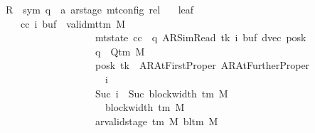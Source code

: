 \begin{isabellebody}
\ \ \ \ \ R{\isacharprime}{\kern0pt}\ {\isacharcolon}{\kern0pt}{\isacharcolon}{\kern0pt}\ {\isachardoublequoteopen}{\isacharparenleft}{\kern0pt}sym{}{\isacharcomma}{\kern0pt}\ {\isacharprime}{\kern0pt}q\ {\isasymtimes}\ {\isacharprime}{\kern0pt}a\ ar{\isacharunderscore}{\kern0pt}stage{\isacharparenright}{\kern0pt}\ mt{\isacharunderscore}{\kern0pt}config\ rel{\isachardoublequoteclose}\isanewline
\ \ \ leaf{\isacharcolon}{\kern0pt}\isanewline
\ \ \ \ \ \ \ \ {\isachardoublequoteopen}{\isasymAnd}cc\ i\ buf{\isacharprime}{\kern0pt}{\isachardot}{\kern0pt}\ {\isasymlbrakk}\ valid{\isacharunderscore}{\kern0pt}mttm\ M{\isacharsemicolon}{\kern0pt}\isanewline
\ \ \ \ \ \ \ \ \ \ \ \ \ \ \ \ \ \ \ \ \ \ \ mt{\isacharunderscore}{\kern0pt}state\ cc\ {\isacharequal}{\kern0pt}\ {\isacharparenleft}{\kern0pt}q{\isacharcomma}{\kern0pt}\ AR{\isacharunderscore}{\kern0pt}SimRead{\isacharcomma}{\kern0pt}\ tk{\isacharcomma}{\kern0pt}\ i{\isacharcomma}{\kern0pt}\ buf{\isacharprime}{\kern0pt}{\isacharcomma}{\kern0pt}\ dvec{\isacharcomma}{\kern0pt}\ posk{\isacharparenright}{\kern0pt}{\isacharsemicolon}{\kern0pt}\isanewline
\ \ \ \ \ \ \ \ \ \ \ \ \ \ \ \ \ \ \ \ \ \ \ q\ {\isasymin}\ Q{\isacharunderscore}{\kern0pt}tm\ M{\isacharsemicolon}{\kern0pt}\isanewline
\ \ \ \ \ \ \ \ \ \ \ \ \ \ \ \ \ \ \ \ \ \ \ posk\ tk\ {\isasymin}\ {\isacharbraceleft}{\kern0pt}AR{\isacharunderscore}{\kern0pt}AtFirstProper{\isacharcomma}{\kern0pt}\ AR{\isacharunderscore}{\kern0pt}AtFurtherProper{\isacharbraceright}{\kern0pt}{\isacharsemicolon}{\kern0pt}\isanewline
\ \ \ \ \ \ \ \ \ \ \ \ \ \ \ \ \ \ \ \ \ \ \ {}\ {\isasymle}\ i{\isacharsemicolon}{\kern0pt}\isanewline
\ \ \ \ \ \ \ \ \ \ \ \ \ \ \ \ \ \ \ \ \ \ \ Suc\ i\ {\isasymle}\ Suc\ {\isacharparenleft}{\kern0pt}block{\isacharunderscore}{\kern0pt}width\ {\isacharparenleft}{\kern0pt}{\isasymGamma}{\isacharunderscore}{\kern0pt}tm\ M{\isacharparenright}{\kern0pt}{\isacharparenright}{\kern0pt}{\isacharsemicolon}{\kern0pt}\isanewline
\ \ \ \ \ \ \ \ \ \ \ \ \ \ \ \ \ \ \ \ \ \ \ {}\ {\isasymle}\ block{\isacharunderscore}{\kern0pt}width\ {\isacharparenleft}{\kern0pt}{\isasymGamma}{\isacharunderscore}{\kern0pt}tm\ M{\isacharparenright}{\kern0pt}{\isacharsemicolon}{\kern0pt}\isanewline
\ \ \ \ \ \ \ \ \ \ \ \ \ \ \ \ \ \ \ \ \ \ \ ar{\isacharunderscore}{\kern0pt}valid{\isacharunderscore}{\kern0pt}stage\ {\isacharparenleft}{\kern0pt}{\isasymGamma}{\isacharunderscore}{\kern0pt}tm\ M{\isacharparenright}{\kern0pt}\ {\isacharparenleft}{\kern0pt}bl{\isacharunderscore}{\kern0pt}tm\ M{\isacharparenright}{\kern0pt}\isanewline

\end{isabellebody}
